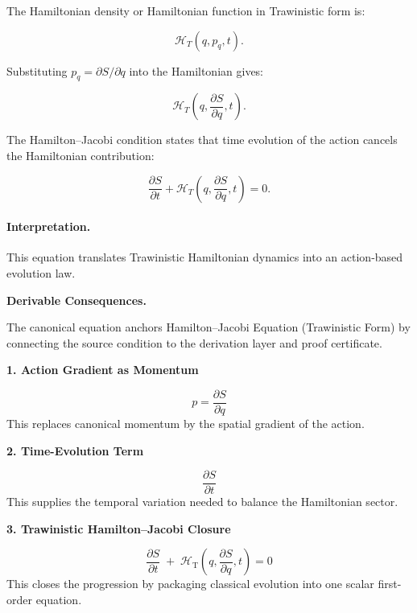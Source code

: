 The Hamiltonian density or Hamiltonian function in Trawinistic form is:

\begin{equation}
\mathcal{H}_T(q,p_q,t).
\end{equation}

Substituting $p_q=\partial S/\partial q$ into the Hamiltonian gives:

\begin{equation}
\mathcal{H}_T
\left(
q,\frac{\partial S}{\partial q},t
\right).
\end{equation}

The Hamilton--Jacobi condition states that time evolution of the action cancels the Hamiltonian contribution:

\begin{equation}
\boxed{
\frac{\partial S}{\partial t}
+
\mathcal{H}_T
\left(
q,\frac{\partial S}{\partial q},t
\right)
=
0 .
}
\end{equation}

\paragraph{Interpretation.}
This equation translates Trawinistic Hamiltonian dynamics into an action-based evolution law.

\par\vspace{0.35em}
\noindent\textbf{Derivable Consequences.}\quad
\begingroup
\footnotesize
\raggedright
The canonical equation anchors Hamilton--Jacobi Equation (Trawinistic Form) by connecting the source condition to the derivation layer and proof certificate.
\par\endgroup

\noindent\textbf{1. Action Gradient as Momentum}\par
\[
p=\frac{\partial S}{\partial q}
\]
\noindent This replaces canonical momentum by the spatial gradient of the action.\par
\noindent\textbf{2. Time-Evolution Term}\par
\[
\frac{\partial S}{\partial t}
\]
\noindent This supplies the temporal variation needed to balance the Hamiltonian sector.\par
\noindent\textbf{3. Trawinistic Hamilton--Jacobi Closure}\par
\[
\frac{\partial S}{\partial t}
\;+\;
\mathcal{H}_{\mathrm{T}}
\!\left(
q,\frac{\partial S}{\partial q},t
\right)
=0
\]
\noindent This closes the progression by packaging classical evolution into one scalar first-order equation.\par

